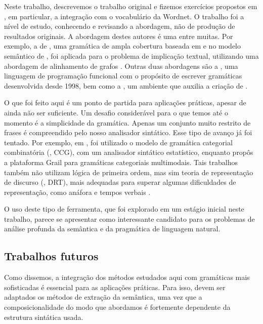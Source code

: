 
Neste trabalho, descrevemos o trabalho original e fizemos exercícios propostos em \cite{BlackburnBos:2005}, em particular, a integração com o vocabulário da Wordnet. O trabalho foi a nível de estudo, conhecendo e revisando a abordagem, não de produção de resultados originais. A abordagem destes autores é uma entre muitas. Por exemplo, a  de \citet{ERG}, uma gramática de ampla cobertura baseada em  e no modelo semântico de , foi aplicada para o problema de implicação textual, utilizando uma abordagem de alinhamento de grafos \citep{semantic-parsing}. Outras duas abordagens são a , uma linguagem de programação funcional com o propósito de escrever gramáticas desenvolvida desde 1998, bem como a , um ambiente que auxilia a criação de  \citep{xle}. \update

O que foi feito aqui é um ponto de partida para aplicações práticas, apesar de ainda não ser suficiente. Um desafio considerável para o que temos até o momento é a simplicidade da gramática. Apenas um conjunto muito restrito de frases é compreendido pelo nosso analisador sintático. Esse tipo de avanço já foi tentado. Por exemplo, em \cite{BosMarkert2006}, foi utilizado o modelo de gramática categorial combinatória (, CCG), com um analisador sintático estatístico, enquanto \cite{Moot2010} propôs a plataforma Grail para gramáticas categoriais multimodais. Tais trabalhos também não utilizam lógica de primeira ordem, mas sim teoria de representação de discurso (, DRT), mais adequadas para superar algumas dificuldades de representação, como anáfora e tempos verbais \cite[p.~1]{Kamp:1993}.

O uso deste tipo de ferramenta, que foi explorado em um estágio inicial neste trabalho, parece se apresentar como interessante candidato para os problemas de análise profunda da semântica e da pragmática de linguagem natural.


\subsection{Trabalhos futuros}

  Como dissemos, a integração dos métodos estudados aqui com gramáticas mais sofisticadas é essencial para as aplicações práticas. Para isso, devem ser adaptados os métodos de extração da semântica, uma vez que a composicionalidade do modo que abordamos é fortemente dependente da estrutura sintática usada.
  
